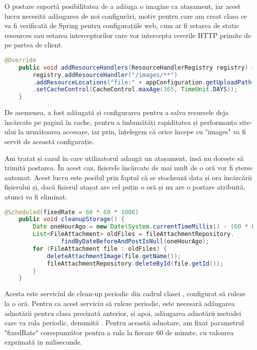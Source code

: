 O postare suportă posibilitatea de a adăuga o imagine ca atașament, iar acest lucru necesită adăugarea de noi configurări, motiv pentru care am creat clasa  ce va fi verificată de Spring pentru configurațiile web, cum ar fi setarea de static resources sau setarea interceptorilor care vor intercepta cererile HTTP primite de pe partea de client.\newline

\begin{lstlisting}[language=Java]
	    @Override
	public void addResourceHandlers(ResourceHandlerRegistry registry) {
		registry.addResourceHandler("/images/**")
		.addResourceLocations("file:" + appConfiguration.getUploadPath() + "/")
		.setCacheControl(CacheControl.maxAge(365, TimeUnit.DAYS));
	}
\end{lstlisting}
\bigskip
De asemenea, a fost adăugată și configurarea pentru a salva resursele deja încărcate pe pagină în cache, pentru a îmbunătăți rapiditatea și performanța site-ului la următoarea accesare, iar prin\newline {}, înțelegem că orice începe cu "images" va fi servit de această configurație.\newline

Am tratat și cazul în care utilizatorul adaugă un atașament, însă nu dorește să trimită postarea. În acest caz, fișierele încărcate de mai mult de o oră vor fi șterse automat. Acest lucru este posibil prin faptul că se stochează data și ora încărcării fișierului și, dacă fișierul atașat are cel puțin o oră și nu are o postare atribuită, atunci va fi eliminat.\newline

\begin{lstlisting}[language=Java]
	@Scheduled(fixedRate = 60 * 60 * 1000)
	public void cleanupStorage() {
		Date oneHourAgo = new Date(System.currentTimeMillis() - (60 * 60 * 1000));
		List<FileAttachment> oldFiles = fileAttachmentRepository.
				findByDateBeforeAndPostIsNull(oneHourAgo);
		for (FileAttachment file : oldFiles) {
			deleteAttachmentImage(file.getName());
			fileAttachmentRepository.deleteById(file.getId());
		}
	}
\end{lstlisting}
\bigskip

Acesta este serviciul de clean-up periodic din cadrul clasei , configurat să ruleze la o oră. Pentru ca acest serviciu să ruleze periodic, este necesară adăugarea adnotării  pentru clasa precizată anterior, și apoi, adăugarea adnotării  metodei care va rula periodic, denumită . Pentru această adnotare, am fixat parametrul "fixedRate" corespunzător pentru a rula la fiecare 60 de minute, cu valoarea exprimată in milisecunde.\newline

